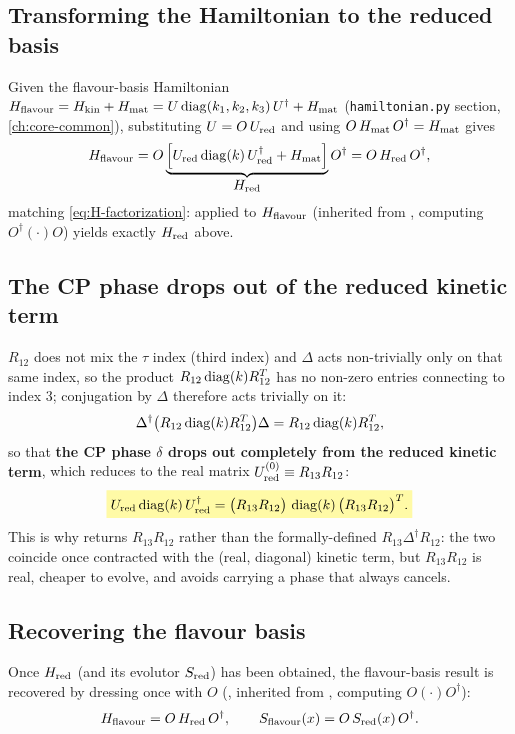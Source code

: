 \begin{theorybox}
\subsection*{Transforming the Hamiltonian to the reduced basis}
Given the flavour-basis Hamiltonian
$H_{\rm flavour}=H_{\rm kin}+H_{\rm mat}=U\operatorname{diag}(k_1,k_2,k_3)\,U^\dagger + H_{\rm mat}$
(\texttt{hamiltonian.py} section, \cref{ch:core-common}), substituting
$U=O\,U_{\rm red}$ and using $O\,H_{\rm mat}\,O^\dagger=H_{\rm mat}$ gives
\begin{equation}
  H_{\rm flavour} = O\underbrace{\Bigl[U_{\rm red}\operatorname{diag}(k)\,U_{\rm red}^\dagger + H_{\rm mat}\Bigr]}_{\displaystyle H_{\rm red}}O^\dagger = O\,H_{\rm red}\,O^\dagger,
\end{equation}
matching \cref{eq:H-factorization}: 
applied to $H_{\rm flavour}$ (inherited from , computing
$O^\dagger(\cdot)O$) yields exactly $H_{\rm red}$ above.

\subsection*{The CP phase drops out of the reduced kinetic term}
$R_{12}$ does not mix the $\tau$ index (third index) and $\Delta$ acts
non-trivially only on that same index, so the product
$R_{12}\operatorname{diag}(k)R_{12}^T$ has no non-zero entries connecting to index 3;
conjugation by $\Delta$ therefore acts trivially on it:
\begin{equation}
  \Delta^\dagger\bigl(R_{12}\operatorname{diag}(k)R_{12}^T\bigr)\Delta = R_{12}\operatorname{diag}(k)R_{12}^T,
\end{equation}
so that \textbf{the CP phase $\delta$ drops out completely from the reduced
kinetic term}, which reduces to the real matrix
$U_{\rm red}^{(0)} \equiv R_{13}R_{12}$:
\begin{equation}
  \keyresult{U_{\rm red}\diag(k)\,U_{\rm red}^\dagger = \bigl(R_{13}R_{12}\bigr)\,\diag(k)\,\bigl(R_{13}R_{12}\bigr)^T.}
\end{equation}
This is why  returns $R_{13}R_{12}$ rather than
the formally-defined $R_{13}\Delta^\dagger R_{12}$: the two coincide once
contracted with the (real, diagonal) kinetic term, but $R_{13}R_{12}$ is
real, cheaper to evolve, and avoids carrying a phase that always cancels.

\subsection*{Recovering the flavour basis}
Once $H_{\rm red}$ (and its evolutor $S_{\rm red}$) has been obtained, the
flavour-basis result is recovered by dressing once with $O$
(, inherited from , computing
$O(\cdot)O^\dagger$):
\begin{equation}
  H_{\rm flavour} = O\,H_{\rm red}\,O^\dagger,
  \qquad
  S_{\rm flavour}(x) = O\,S_{\rm red}(x)\,O^\dagger.
\end{equation}
\end{theorybox}

